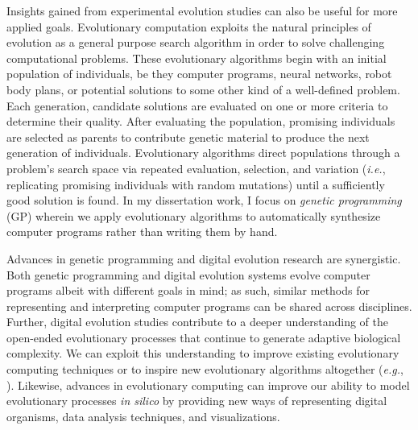 Insights gained from experimental evolution studies can also be useful for more applied goals.
Evolutionary computation exploits the natural principles of evolution as a general purpose search algorithm in order to solve challenging computational problems.
These evolutionary algorithms begin with an initial population of individuals, be they computer programs, neural networks, robot body plans, or potential solutions to some other kind of a well-defined problem. %
Each generation, candidate solutions are evaluated on one or more criteria to determine their quality. 
After evaluating the population, promising individuals are selected as parents to contribute genetic material to produce the next generation of individuals.
Evolutionary algorithms direct populations through a problem's search space via repeated evaluation, selection, and variation (\textit{i.e.}, replicating promising individuals with random mutations) until a sufficiently good solution is found. 
In my dissertation work, I focus on \textit{genetic programming} (GP) wherein we apply evolutionary algorithms to automatically synthesize computer programs rather than writing them by hand.

Advances in genetic programming and digital evolution research are synergistic.
Both genetic programming and digital evolution systems evolve computer programs albeit with different goals in mind; as such, similar methods for representing and interpreting computer programs can be shared across disciplines.
Further, digital evolution studies contribute to a deeper understanding of the open-ended evolutionary processes that continue to generate adaptive biological complexity. 
We can exploit this understanding to improve existing evolutionary computing techniques or to inspire new evolutionary algorithms altogether (\textit{e.g.}, \citealt{goldberg_genetic_1987,spector_autoconstructive_2011,goings_ecology-based_2012}). %
Likewise, advances in evolutionary computing can improve our ability to model evolutionary processes \textit{in silico} by providing new ways of representing digital organisms, data analysis techniques, and visualizations. 

